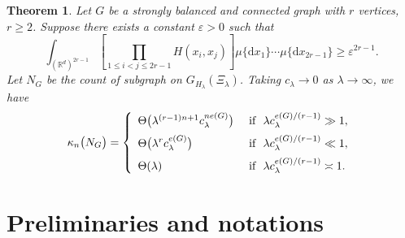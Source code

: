 \documentclass[12pt]{article}
\newcommand{\R}{\mathbb{R}}
\newtheorem{thm}[prop]{Theorem}
\numberwithin{equation}{section}
\begin{document}
\begin{thm}\label{thm-2}
  Let $G$ be a strongly balanced and connected graph with $r$ vertices, $r\ge2$. Suppose there exists a constant $\varepsilon>0$ such that 
  \begin{equation}
    \int_{(\R^d)^{2r-1}}\left[\prod_{1\le i<j\le 2r-1}H(x_i,x_j)\right]\mu\{\mathrm{d}x_1\}\cdots\mu\{\mathrm{d}x_{2r-1}\}\ge \varepsilon^{2r-1}.
  \end{equation}
 Let $N_G$ be the count of subgraph on $G_{H_\lambda}(\Xi_{\lambda})$. Taking $c_\lambda\to0$ as $\lambda\to\infty$, we have
  \begin{eqnarray}
    \kappa_n\big(N_G\big)=\left\{\begin{array}{ll}
      \Theta\big(\lambda^{(r-1)n+1} c_\lambda^{ne(G)}\big) & \ \mbox{if }\ \lambda c_\lambda^{e(G)/(r-1)}\gg1,
      \medskip
      \\
      \displaystyle
\Theta\big(\lambda^{r}c_\lambda^{e(G)}\big) & \ \mbox{if }\ \lambda c_\lambda^{e(G)/(r-1)}\ll1,
    \medskip
    \\
    \displaystyle
    \Theta(\lambda) & \ \mbox{if }\ \lambda c_\lambda^{e(G)/(r-1)}\asymp1.
    \end{array}
    \right.
  \end{eqnarray}
\end{thm}



 

\section{Preliminaries and notations}\label{prelim}
\end{document}
